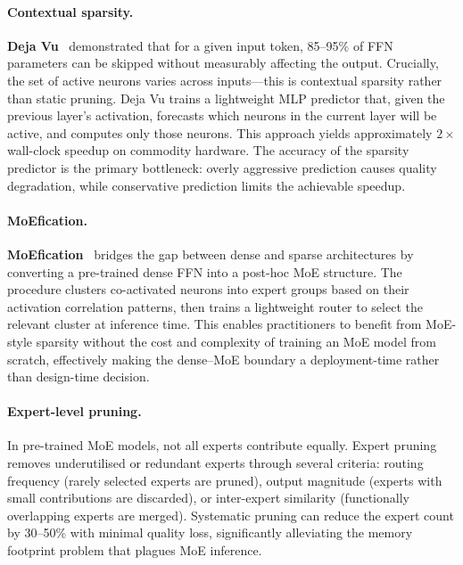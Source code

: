 \paragraph{Contextual sparsity.}
\textbf{Deja Vu}~\cite{liu2023deja} demonstrated that for a given input token, 85--95\% of FFN parameters can be skipped without measurably affecting the output.
Crucially, the set of active neurons varies across inputs---this is contextual sparsity rather than static pruning.
Deja Vu trains a lightweight MLP predictor that, given the previous layer's activation, forecasts which neurons in the current layer will be active, and computes only those neurons.
This approach yields approximately $2\times$ wall-clock speedup on commodity hardware.
The accuracy of the sparsity predictor is the primary bottleneck: overly aggressive prediction causes quality degradation, while conservative prediction limits the achievable speedup.

\paragraph{MoEfication.}
\textbf{MoEfication}~\cite{zhang2022moefication} bridges the gap between dense and sparse architectures by converting a pre-trained dense FFN into a post-hoc MoE structure.
The procedure clusters co-activated neurons into expert groups based on their activation correlation patterns, then trains a lightweight router to select the relevant cluster at inference time.
This enables practitioners to benefit from MoE-style sparsity without the cost and complexity of training an MoE model from scratch, effectively making the dense--MoE boundary a deployment-time rather than design-time decision.

\paragraph{Expert-level pruning.}
In pre-trained MoE models, not all experts contribute equally.
Expert pruning removes underutilised or redundant experts through several criteria: routing frequency (rarely selected experts are pruned), output magnitude (experts with small contributions are discarded), or inter-expert similarity (functionally overlapping experts are merged).
Systematic pruning can reduce the expert count by 30--50\% with minimal quality loss, significantly alleviating the memory footprint problem that plagues MoE inference.

